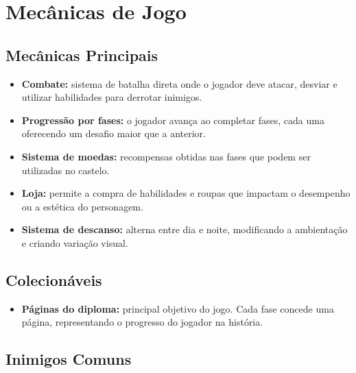 \documentclass[12pt,a4paper]{article}
\begin{document}
\newpage


\section*{Mecânicas de Jogo}

\subsection*{Mecânicas Principais}

\begin{itemize}
    \item \textbf{Combate:} sistema de batalha direta onde o jogador deve atacar,
    desviar e utilizar habilidades para derrotar inimigos.
    
    \item \textbf{Progressão por fases:} o jogador avança ao completar fases,
    cada uma oferecendo um desafio maior que a anterior.
    
    \item \textbf{Sistema de moedas:} recompensas obtidas nas fases que podem ser
    utilizadas no castelo.
    
    \item \textbf{Loja:} permite a compra de habilidades e roupas que impactam o desempenho
    ou a estética do personagem.
    
    \item \textbf{Sistema de descanso:} alterna entre dia e noite, modificando a ambientação
    e criando variação visual.
\end{itemize}

\subsection*{Colecionáveis}

\begin{itemize}
    \item \textbf{Páginas do diploma:} principal objetivo do jogo. Cada fase concede uma página,
    representando o progresso do jogador na história.
\end{itemize}

\newpage


\subsection*{Inimigos Comuns}
\end{document}
